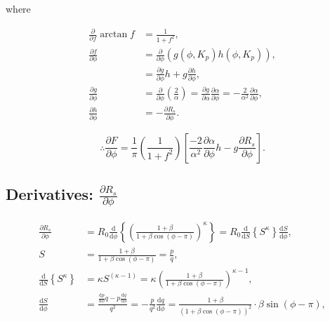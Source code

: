 \documentclass[]{article}
\begin{document}
		where

		\begin{align}
			\frac{\partial }{\partial f} \arctan{f} &= \frac{1}{1 + f^2}, \\
			\frac{\partial f}{\partial \phi} &= \frac{\partial }{\partial \phi} (g(\phi,K_p) h(\phi,K_p)), \\
			&= \frac{\partial g}{\partial \phi}h + g\frac{\partial h}{\partial \phi},\\
			\frac{\partial g}{\partial \phi} &= \frac{\partial}{\partial \phi} \left(\frac{2}{\alpha}\right) = \frac{\partial g}{\partial \alpha} \frac{\partial \alpha}{\partial \phi} = -\frac{2}{\alpha^2}\frac{\partial \alpha}{\partial \phi}, \\
			\frac{\partial h}{\partial \phi} &= -\frac{\partial R_s}{\partial \phi}.
		\end{align}
		
		\begin{equation}
			\boxed{\therefore 	\frac{\partial F}{\partial \phi} = \frac{1}{\pi} \left(\frac{1}{1+f^2}\right) \left[\frac{-2}{\alpha^2}\frac{\partial \alpha}{\partial \phi} h - g \frac{\partial R_s}{\partial \phi} \right].}
		\end{equation}

		
	\subsection{Derivatives: $\frac{\partial R_s}{\partial \phi}$}
		
		\begin{align}
			\frac{\partial R_s}{\partial \phi} &= R_0 \frac{\mathrm{d}}{\mathrm{d} \phi} \left\{ \left(\frac{1+\beta}{1 + \beta\cos{(\phi-\pi)}}\right)^\kappa \right\} = R_0 \frac{\mathrm{d}}{\mathrm{d} S} \left\{ S^\kappa \right\} \frac{\mathrm{d} S}{\mathrm{d} \phi}, \\
			S &= \frac{1+\beta}{1 + \beta\cos{(\phi-\pi)}} = \frac{p}{q}, \\
			\frac{\mathrm{d}}{\mathrm{d} S} \left\{ S^\kappa \right\} &= \kappa S^{(\kappa -1)} = \kappa \left(\frac{1+\beta}{1 + \beta\cos{(\phi-\pi)}}\right)^{\kappa-1},\\
			\frac{\mathrm{d} S}{\mathrm{d} \phi} &= \frac{\frac{\text{d} p}{\text{d} \phi}q - p \frac{\mathrm{d} q}{\mathrm{d} \phi}}{q^2} = -\frac{p}{q^2} \frac{\mathrm{d} q}{\mathrm{d} \phi} = \frac{1 + \beta}{(1 + \beta\cos{(\phi - \pi)})^2} \cdot \beta \sin{(\phi - \pi)}, 
		\end{align}
		
\end{document}
